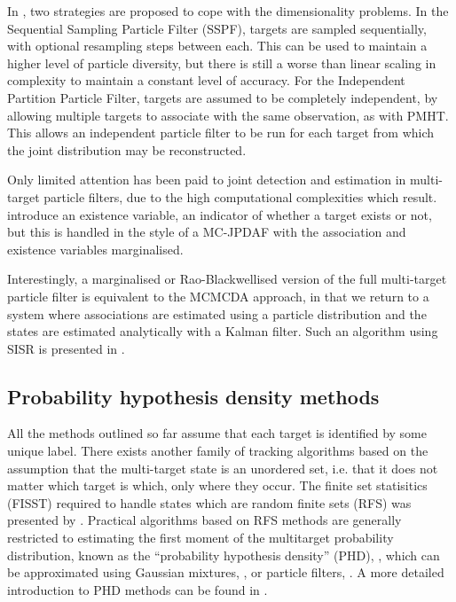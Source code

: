In \cite{Vermaak2005}, two strategies are proposed to cope with the dimensionality problems. In the Sequential Sampling Particle Filter (SSPF), targets are sampled sequentially, with optional resampling steps between each. This can be used to maintain a higher level of particle diversity, but there is still a worse than linear scaling in complexity to maintain a constant level of accuracy. For the Independent Partition Particle Filter, targets are assumed to be completely independent, by allowing multiple targets to associate with the same observation, as with PMHT. This allows an independent particle filter to be run for each target from which the joint distribution may be reconstructed.

Only limited attention has been paid to joint detection and estimation in multi-target particle filters, due to the high computational complexities which result. \cite{Vermaak2005,Horridge2009} introduce an existence variable, an indicator of whether a target exists or not, but this is handled in the style of a MC-JPDAF with the association and existence variables marginalised.

Interestingly, a marginalised or Rao-Blackwellised version of the full multi-target particle filter is equivalent to the MCMCDA approach, in that we return to a system where associations are estimated using a particle distribution and the states are estimated analytically with a Kalman filter. Such an algorithm using SISR is presented in \cite{Sarkka2007}.




\subsection{Probability hypothesis density methods}
All the methods outlined so far assume that each target is identified by some unique label. There exists another family of tracking algorithms based on the assumption that the multi-target state is an unordered set, i.e. that it does not matter which target is which, only where they occur. The finite set statisitics (FISST) required to handle states which are random finite sets (RFS) was presented by \cite{Mahler1994}. Practical algorithms based on RFS methods are generally restricted to estimating the first moment of the multitarget probability distribution, known as the ``probability hypothesis density'' (PHD), \cite{Mahler2003}, which can be approximated using Gaussian mixtures, \cite{Vo2006}, or particle filters, \cite{Vo2005,Whiteley2010}. A more detailed introduction to PHD methods can be found in \cite{Mahler2004,Wood2010}.



